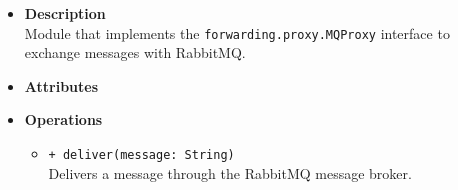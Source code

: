 \FloatBarrier
\begin{itemize}
  \item \textbf{Description} \\
    Module that implements the \texttt{forwarding.proxy.MQProxy}
    interface to exchange messages with RabbitMQ.
  \item \textbf{Attributes}
  \item \textbf{Operations}
  \begin{itemize}
    \item \texttt{+ deliver(message: String)} \\
    Delivers a message through the RabbitMQ message broker.
  \end{itemize}
\end{itemize}
